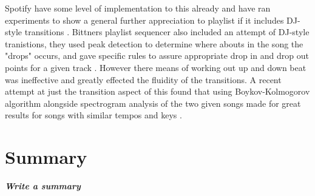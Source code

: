 Spotify have some level of implementation to this already and have ran experiments to show a general further appreciation to playlist if it includes DJ-style transitions \citep{bittner_automatic_2017}. Bittners playlist sequencer also included an attempt of DJ-style tranistions, they used peak detection to determine where abouts in the song the "drops" occurs, and gave specific rules to assure appropriate drop in and drop out points for a given track \citep{bittner_automatic_2017}.  However there means of working out up and down beat was ineffective and greatly effected the fluidity of the transitions. A recent attempt at just the transition aspect of this found that using Boykov-Kolmogorov algorithm alongside spectrogram analysis of the two given songs made for great results for songs with similar tempos and keys \citep{robinson_automated_2023}.

\section{Summary}
\textbf{\textit{Write a summary}}

